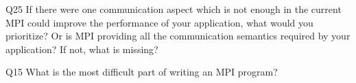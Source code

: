 \begin{description}%
\item{Q25} If there were one communication aspect which is not enough in the current MPI could improve the performance of your application, what would you prioritize? Or is MPI providing all the communication semantics required by your application? If not, what is missing?%
\item{Q15} What is the most difficult part of writing an MPI program?%
\end{description}%
